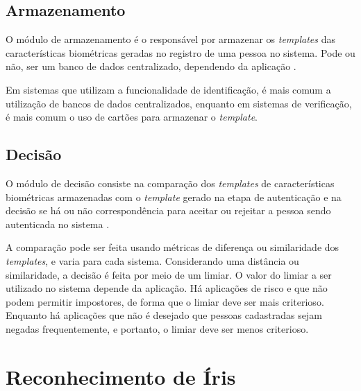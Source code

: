 \subsection{Armazenamento}

\par O módulo de armazenamento é o responsável por armazenar os \textit{templates} das características biométricas geradas no registro de uma pessoa no sistema. Pode ou não, ser um banco de dados centralizado, dependendo da aplicação \cite{wayman2005biometric}.

\par Em sistemas que utilizam a funcionalidade de identificação, é mais comum a utilização de bancos de dados centralizados, enquanto em sistemas de verificação, é mais comum o uso de cartões para armazenar o \textit{template}.

\subsection{Decisão} \label{sec:sis_bio:decisao}

\par O módulo de decisão consiste na comparação dos \textit{templates} de características biométricas armazenadas com o \textit{template} gerado na etapa de autenticação e na decisão se há ou não correspondência para aceitar ou rejeitar a pessoa sendo autenticada no sistema \cite{wayman2005biometric}.

\par A comparação pode ser feita usando métricas de diferença ou similaridade dos \textit{templates}, e varia para cada sistema. Considerando uma distância ou similaridade, a decisão é feita por meio de um limiar. O valor do limiar a ser utilizado no sistema depende da aplicação. Há aplicações de risco e que não podem permitir impostores, de forma que o limiar deve ser mais criterioso. Enquanto há aplicações que não é desejado que pessoas cadastradas sejam negadas frequentemente, e portanto, o limiar deve ser menos criterioso.

\section{Reconhecimento de Íris}

